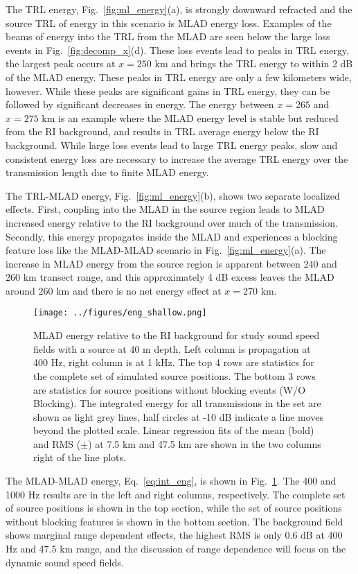 \documentclass[preprint,NumberedRefs]{JASA}
\begin{document}
The TRL energy, Fig.~\ref{fig:ml_energy}(a), is strongly downward refracted and the source TRL of energy in this scenario is MLAD energy loss. Examples of the beams of energy into the TRL from the MLAD are seen below the large loss events in Fig.~\ref{fig:decomp_x}(d). These loss events lead to peaks in TRL energy, the largest peak occurs at $x=250$ km and brings the TRL energy to within 2 dB of the MLAD energy. These peaks in TRL energy are only a few kilometers wide, however. While these peaks are significant gains in TRL energy, they can be followed by significant decreases in energy. The energy between $x=265$ and $x=275$ km is an example where the MLAD energy level is stable but reduced from the RI background, and results in TRL average energy below the RI background. While large loss events lead to large TRL energy peaks, slow and consistent energy loss are necessary to increase the average TRL energy over the transmission length due to finite MLAD energy.

The TRL-MLAD energy, Fig.~\ref{fig:ml_energy}(b), shows two separate localized effects. First, coupling into the MLAD in the source region leads to MLAD increased energy relative to the RI background over much of the transmission. Secondly, this energy propagates inside the MLAD and experiences a blocking feature loss like the MLAD-MLAD scenario in Fig.~\ref{fig:ml_energy}(a). The increase in MLAD energy from the source region is apparent between 240 and 260 km transect range, and this approximately 4 dB excess leaves the MLAD around 260 km and there is no net energy effect at $x=270$ km.

\begin{figure}
\texttt{[image: ../figures/eng\_shallow.png]}
    \caption{MLAD energy relative to the RI background for study sound speed fields with a source at 40 m depth. Left column is propagation at 400 Hz, right column is at 1 kHz. The top 4 rows are statistics for the complete set of simulated source positions. The bottom 3 rows are statistics for source positions without blocking events (W/O Blocking). The integrated energy for all transmissions in the set are shown as light grey lines, half circles at -10 dB indicate a line moves beyond the plotted scale. Linear regression fits of the mean (bold) and RMS ($\pm$) at 7.5 km and 47.5 km are shown in the two columns right of the line plots.}
    \label{fig:shal_eng}
\end{figure}
The MLAD-MLAD energy, Eq.~\eqref{eq:int_eng}, is shown in Fig.~\ref{fig:shal_eng}. The 400 and 1000 Hz results are in the left and right columns, respectively. The complete set of source positions is shown in the top section, while the set of source positions without blocking features is shown in the bottom section. The background field shows marginal range dependent effects, the highest RMS is only 0.6 dB at 400 Hz and 47.5 km range, and the discussion of range dependence will focus on the dynamic sound speed fields.
\end{document}
